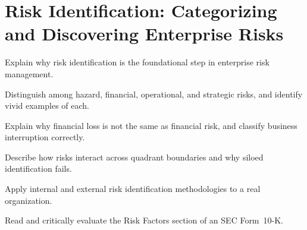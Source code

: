 \documentclass[11pt,openany]{book}
\begin{document}
\setcounter{chapter}{2}
\chapter{Risk Identification: Categorizing and Discovering Enterprise Risks}
\label{chap:risk-identification}

\begin{learningobjectives}
  \item Explain why risk identification is the foundational step in enterprise risk management.
  \item Distinguish among hazard, financial, operational, and strategic risks, and identify vivid examples of each.
  \item Explain why financial loss is not the same as financial risk, and classify business interruption correctly.
  \item Describe how risks interact across quadrant boundaries and why siloed identification fails.
  \item Apply internal and external risk identification methodologies to a real organization.
  \item Read and critically evaluate the Risk Factors section of an SEC Form~10-K.
\end{learningobjectives}
\end{document}
